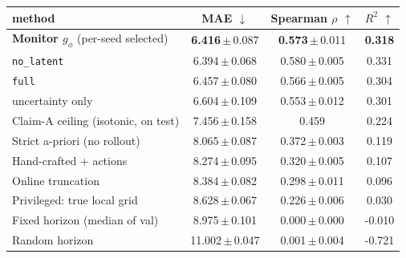 \begin{tabular}{lccc}
\toprule
method & MAE $\downarrow$ & Spearman $\rho$ $\uparrow$ & $R^2$ $\uparrow$ \\
\midrule
\textbf{Monitor $g_\phi$} (per-seed selected) & \textbf{6.416}\,$\pm$\,0.087 & \textbf{0.573}\,$\pm$\,0.011 & \textbf{0.318} \\
\quad \texttt{no\_latent} & 6.394\,$\pm$\,0.068 & 0.580\,$\pm$\,0.005 & 0.331 \\
\quad \texttt{full} & 6.457\,$\pm$\,0.080 & 0.566\,$\pm$\,0.005 & 0.304 \\
\quad uncertainty only & 6.604\,$\pm$\,0.109 & 0.553\,$\pm$\,0.012 & 0.301 \\
\midrule
Claim-A ceiling (isotonic, on test) & 7.456\,$\pm$\,0.158 & 0.459 & 0.224 \\
Strict a-priori (no rollout) & 8.065\,$\pm$\,0.087 & 0.372\,$\pm$\,0.003 & 0.119 \\
Hand-crafted + actions & 8.274\,$\pm$\,0.095 & 0.320\,$\pm$\,0.005 & 0.107 \\
Online truncation & 8.384\,$\pm$\,0.082 & 0.298\,$\pm$\,0.011 & 0.096 \\
Privileged: true local grid & 8.628\,$\pm$\,0.067 & 0.226\,$\pm$\,0.006 & 0.030 \\
Fixed horizon (median of val) & 8.975\,$\pm$\,0.101 & 0.000\,$\pm$\,0.000 & -0.010 \\
Random horizon & 11.002\,$\pm$\,0.047 & 0.001\,$\pm$\,0.004 & -0.721 \\
\bottomrule
\end{tabular}